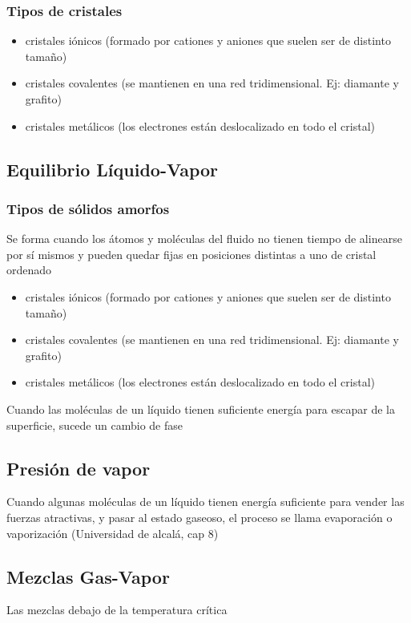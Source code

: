     \subsubsection*{Tipos de cristales}
    \begin{itemize}
      \item cristales iónicos (formado por cationes y aniones que suelen ser de distinto tamaño)
      \item cristales covalentes (se mantienen en una red tridimensional. Ej: diamante y grafito)
      \item cristales metálicos (los electrones están deslocalizado en todo el cristal)
    \end{itemize}


\subsection{Equilibrio Líquido-Vapor}
    

\subsubsection*{Tipos de sólidos amorfos}
    Se forma cuando los átomos y moléculas del fluido no tienen tiempo de alinearse por sí mismos y pueden quedar fijas en posiciones distintas a uno de cristal ordenado
    \begin{itemize}
      \item cristales iónicos (formado por cationes y aniones que suelen ser de distinto tamaño)
      \item cristales covalentes (se mantienen en una red tridimensional. Ej: diamante y grafito)
      \item cristales metálicos (los electrones están deslocalizado en todo el cristal)
    \end{itemize}


    Cuando las moléculas de un líquido tienen suficiente energía para escapar de la superficie, sucede un cambio de fase

\subsection{Presión de vapor}
    Cuando algunas moléculas de un líquido tienen energía suficiente para vender las fuerzas atractivas, y pasar al estado gaseoso, el proceso se llama evaporación o vaporización (Universidad de alcalá, cap 8)


\subsection{Mezclas Gas-Vapor}
Las mezclas debajo de la temperatura crítica



